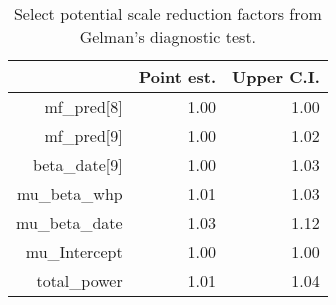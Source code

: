 \begin{table}[h]
\centering
\begin{tabular}{rrr}
  \hline
 & Point est. & Upper C.I. \\ 
  \hline
mf\_pred[8] & 1.00 & 1.00 \\ 
  mf\_pred[9] & 1.00 & 1.02 \\ 
  beta\_date[9] & 1.00 & 1.03 \\ 
  mu\_beta\_whp & 1.01 & 1.03 \\ 
  mu\_beta\_date & 1.03 & 1.12 \\ 
  mu\_Intercept & 1.00 & 1.00 \\ 
  total\_power & 1.01 & 1.04 \\ 
   \hline
\end{tabular}
\caption{Select potential scale reduction factors from Gelman's diagnostic test.} 
\label{tab:gelman}
\end{table}
